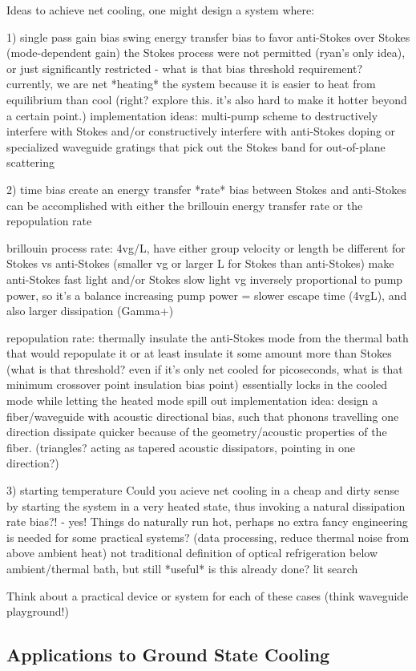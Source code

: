 Ideas to achieve net cooling, one might design a system where:

1) single pass gain bias
     swing energy transfer bias to favor anti-Stokes over Stokes (mode-dependent gain)
     the Stokes process were not permitted (ryan's only idea), or just significantly restricted - what is that bias threshold requirement?
     currently, we are net *heating* the system because it is easier to heat from equilibrium than cool (right? explore this. it's also hard to make it hotter beyond a certain point.)
     implementation ideas:
       multi-pump scheme to destructively interfere with Stokes and/or constructively interfere with anti-Stokes
       doping or specialized waveguide gratings that pick out the Stokes band for out-of-plane scattering

2) time bias
     create an energy transfer *rate* bias between Stokes and anti-Stokes
     can be accomplished with either the brillouin energy transfer rate or the repopulation rate

       brillouin process rate:
         4vg/L, have either group velocity or length be different for Stokes vs anti-Stokes (smaller vg or larger L for Stokes than anti-Stokes)
         make anti-Stokes fast light and/or Stokes slow light
         vg inversely proportional to pump power, so it's a balance
           increasing pump power = slower escape time (4vgL), and also larger dissipation (Gamma+)

       repopulation rate:
         thermally insulate the anti-Stokes mode from the thermal bath that would repopulate it
         or at least insulate it some amount more than Stokes (what is that threshold? even if it's only net cooled for picoseconds, what is that minimum crossover point insulation bias point)
         essentially locks in the cooled mode while letting the heated mode spill out
         implementation idea:
           design a fiber/waveguide with acoustic directional bias, such that phonons travelling one direction dissipate quicker because of the geometry/acoustic properties of the fiber. (triangles? acting as tapered acoustic dissipators, pointing in one direction?)

3) starting temperature
     Could you acieve net cooling in a cheap and dirty sense by starting the system in a very heated state, thus invoking a natural dissipation rate bias?! - yes!
     Things do naturally run hot, perhaps no extra fancy engineering is needed for some practical systems? (data processing, reduce thermal noise from above ambient heat)
     not traditional definition of optical refrigeration below ambient/thermal bath, but still *useful*
     is this already done? lit search

Think about a practical device or system for each of these cases (think waveguide playground!)

\subsection{Applications to Ground State Cooling}
\label{Cooling:subsec:ApplicationstoGroundStateCooling}
